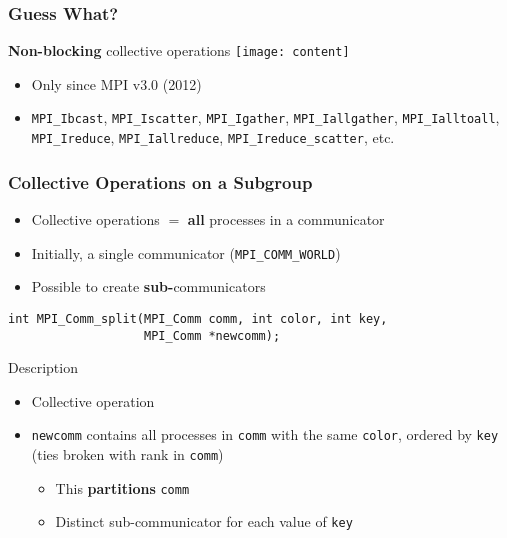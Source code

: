 \documentclass[xcolor={x11names,svgnames,psnames}]{beamer}
\newcommand{\smiley}{\texttt{[image: content]}}
\begin{document}

\begin{frame}[fragile=singleslide]
  \frametitle{Guess What?}
  
  \begin{block}{\textbf{Non-blocking} collective operations \smiley}
    \begin{itemize}
    \item Only since MPI v3.0 (2012)
    \item \texttt{MPI_Ibcast}, \texttt{MPI_Iscatter}, \texttt{MPI_Igather}, \texttt{MPI_Iallgather}, \texttt{MPI_Ialltoall}, \texttt{MPI_Ireduce}, \texttt{MPI_Iallreduce}, \texttt{MPI_Ireduce_scatter}, etc.
    \end{itemize}
  \end{block}
\end{frame}


\begin{frame}[fragile=singleslide]
  \frametitle{Collective Operations on a Subgroup}

  \begin{itemize}
  \item Collective operations $=$ \textbf{all} processes in a \alert{communicator}
  \item Initially, a single communicator (\texttt{MPI_COMM_WORLD})
  \item Possible to create \textbf{sub-}communicators
  \end{itemize}
  
\begin{verbatim}
int MPI_Comm_split(MPI_Comm comm, int color, int key,
                   MPI_Comm *newcomm);
\end{verbatim}

  \begin{block}{Description}
    \begin{itemize}
    \item Collective operation
    \item \texttt{newcomm} contains all processes in \texttt{comm} with the same \texttt{color}, ordered by \texttt{key} (ties broken with rank in \texttt{comm})
      \begin{itemize}
      \item This \textbf{partitions} \texttt{comm}
      \item Distinct sub-communicator for each value of \texttt{key}
      \end{itemize}
    \end{itemize}
  \end{block}
\end{frame}
\end{document}
